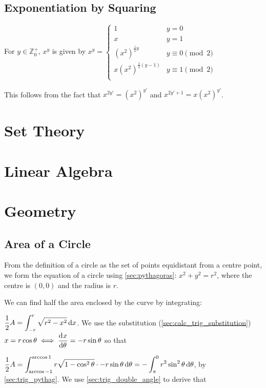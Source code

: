 \documentclass[a4paper,11pt]{article}
\begin{document}
    \subsection{Exponentiation by Squaring} \label{sec:exp_by_squaring}

    For $y \in \mathbb{Z}_0^+$, $x^y$ is given by
    $x^y =
        \begin{cases}
        1 & y = 0 \\
        x & y = 1 \\
        (x ^ 2)^{\frac 12 y} & y \equiv 0 \pmod 2\\
        x(x ^ 2)^{\frac 12 (y-1)} & y \equiv 1 \pmod 2\\
        \end{cases}$

    This follows from the fact that
    $x^{2y'} = (x^2)^{y'}$ and $x^{2y' + 1} = x(x^2)^{y'}$.

    \section{Set Theory}

    \section{Linear Algebra}

    \section{Geometry}

    \subsection{Area of a Circle}


    From the definition of a circle as the set of points equidistant from a
    centre point, we form the equation of a circle using \ref{sec:pythagoras}:
    $x^2 + y^2 = r^2$, where the centre is $(0, 0)$ and the radius is $r$.

    We can find half the area enclosed by the curve by integrating:

    $\displaystyle \frac 12 A = \int_{-r}^r \sqrt{r^2 - x^2} \dif x$. We use the
    substitution (\ref{sec:calc_trig_substitution})
    $x = r \cos \theta \iff \dod x\theta = -r \sin \theta$ so that

    $\displaystyle \frac 12 A = \int_{\arccos -1}^{\arccos 1}
        r\sqrt{1 - \cos^2 \theta} \cdot -r \sin \theta \dif \theta
      = -\int_\pi^0 r^2 \sin^2 \theta \dif \theta$, by \ref{sec:trig_pythag}. We
      use \ref{sec:trig_double_angle} to derive that
\end{document}
